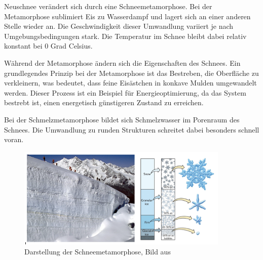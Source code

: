 Neuschnee verändert sich durch eine Schneemetamorphose. Bei der Metamorphose sublimiert Eis zu Wasserdampf und lagert sich an einer anderen Stelle wieder an. Die Geschwindigkeit dieser Umwandlung variiert je nach Umgebungsbedingungen stark. Die Temperatur im Schnee bleibt dabei relativ konstant bei 0 Grad Celsius.

Während der Metamorphose ändern sich die Eigenschaften des Schnees. Ein grundlegendes Prinzip bei der Metamorphose ist das Bestreben, die Oberfläche zu verkleinern, was bedeutet, dass feine Eisästchen in konkave Mulden umgewandelt werden. Dieser Prozess ist ein Beispiel für Energieoptimierung, da das System bestrebt ist, einen energetisch günstigeren Zustand zu erreichen.

Bei der Schmelzmetamorphose bildet sich Schmelzwasser im Porenraum des Schnees. Die Umwandlung zu runden Strukturen schreitet dabei besonders schnell voran. \cite{WSLSLFMetha.2024}

\begin{figure}[H]
    \centering
    \includegraphics[width=0.9\textwidth]{Bilder/gletscher_eis_schnee.png}
    \caption{Darstellung der Schneemetamorphose, Bild aus \cite{Wetterdienst.6222017}}
    \label{fig:Metha}
\end{figure}

